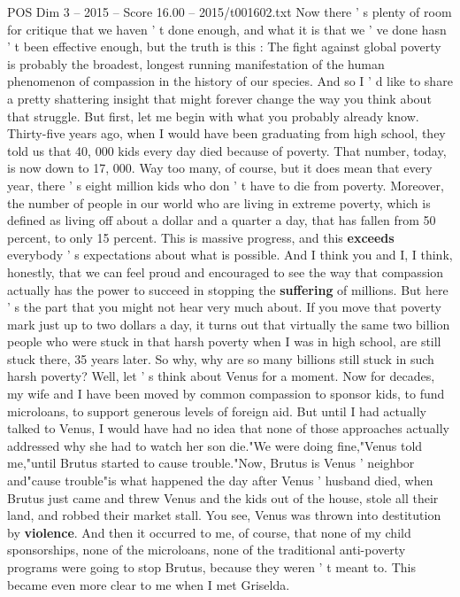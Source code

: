 \begin{textsample}{POS Dim 3 – 2015 – Score 16.00 – 2015/t001602.txt}
Now there ' s plenty of room for critique that we haven ' t done enough, and what it is that we ' ve done hasn ' t been effective enough, but the truth is this : The fight against global poverty is probably the broadest, longest running manifestation of the human phenomenon of compassion in the history of our species.
And so I ' d like to share a pretty shattering insight that might forever change the way you think about that struggle.
But first, let me begin with what you probably already know.
Thirty-five years ago, when I would have been graduating from high school, they told us that 40, 000 kids every day died because of poverty.
That number, today, is now down to 17, 000.
Way too many, of course, but it does mean that every year, there ' s eight million kids who don ' t have to die from poverty.
Moreover, the number of people in our world who are living in extreme poverty, which is defined as living off about a dollar and a quarter a day, that has fallen from 50 percent, to only 15 percent.
This is massive progress, and this \textbf{exceeds} everybody ' s expectations about what is possible.
And I think you and I, I think, honestly, that we can feel proud and encouraged to see the way that compassion actually has the power to succeed in stopping the \textbf{suffering} of millions.
But here ' s the part that you might not hear very much about.
If you move that poverty mark just up to two dollars a day, it turns out that virtually the same two billion people who were stuck in that harsh poverty when I was in high school, are still stuck there, 35 years later.
So why, why are so many billions still stuck in such harsh poverty?
Well, let ' s think about Venus for a moment.
Now for decades, my wife and I have been moved by common compassion to sponsor kids, to fund microloans, to support generous levels of foreign aid.
But until I had actually talked to Venus, I would have had no idea that none of those approaches actually addressed why she had to watch her son die."We were doing fine,"Venus told me,"until Brutus started to cause trouble."Now, Brutus is Venus ' neighbor and"cause trouble"is what happened the day after Venus ' husband died, when Brutus just came and threw Venus and the kids out of the house, stole all their land, and robbed their market stall.
You see, Venus was thrown into destitution by \textbf{violence}.
And then it occurred to me, of course, that none of my child sponsorships, none of the microloans, none of the traditional anti-poverty programs were going to stop Brutus, because they weren ' t meant to.
This became even more clear to me when I met Griselda.

\end{textsample}
